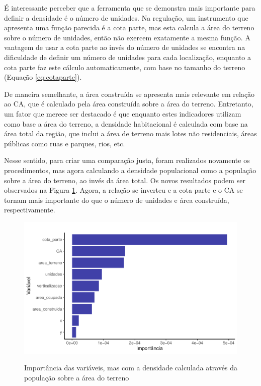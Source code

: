 É interessante perceber que a ferramenta que se demonstra mais importante para definir a densidade é o número de unidades. Na regulação, um instrumento que apresenta uma função parecida é a cota parte, mas esta calcula a área do terreno sobre o número de unidades, então não exercem exatamente a mesma função. A vantagem de usar a cota parte ao invés do número de unidades se encontra na dificuldade de definir um número de unidades para cada localização, enquanto a cota parte faz este cálculo automaticamente, com base no tamanho do terreno (Equação \ref{eq:cotaparte}).

De maneira semelhante, a área construída se apresenta mais relevante em relação ao CA, que é calculado pela área construída sobre a área do terreno. Entretanto, um fator que merece ser destacado é que enquanto estes indicadores utilizam como base a área do terreno, a densidade habitacional é calculada com base na área total da região, que inclui a área de terreno mais lotes não residenciais, áreas públicas como ruas e parques, rios, etc.

Nesse sentido, para criar uma comparação justa, foram realizados novamente os procedimentos, mas agora calculando a densidade populacional como a população sobre a área do terreno, ao invés da área total. Os novos resultados podem ser observados na Figura \ref{fig:importancia_densmod}. Agora, a relação se inverteu e a cota parte e o CA se tornam mais importante do que o número de unidades e área construída, respectivamente.

\begin{figure}[h]
    \centering
    \caption{Importância das variáveis, mas com a densidade calculada através da população sobre a área do terreno}
    \includegraphics[width = .8\linewidth]{imagens/var_importance_densmod.pdf}
    \label{fig:importancia_densmod}
\end{figure}

